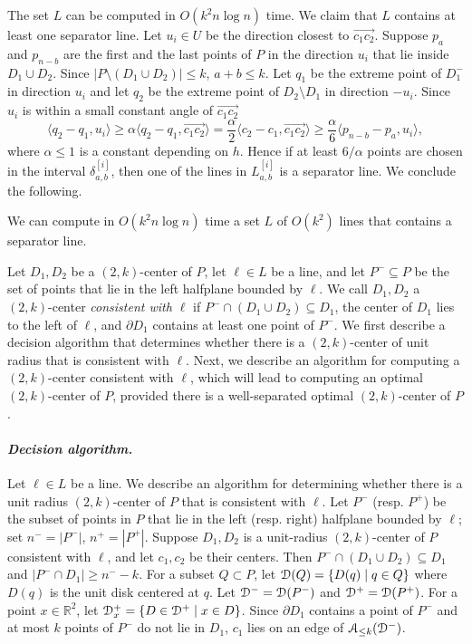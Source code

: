 \documentclass[11pt]{myclass}
\renewcommand{\b}[1]{\ensuremath{\mathbb{#1}}}
\newcommand{\EuD}{\ensuremath{\EuScript{D}}}
\newcommand{\EuA}{\ensuremath{\EuScript{A}}}
\begin{document}
The set $L$ can be computed in $O(k^2 n \log n)$ time.
We claim that $L$ contains at least one separator line.  
Let $u_i \in U$ be the direction closest to $\overrightarrow{c_1 c_2}$.  Suppose $p_a$ and $p_{n-b}$ are the first and the last points of $P$ in the direction $u_i$ that lie inside $D_1 \cup D_2$.  Since $|P \setminus (D_1 \cup D_2)| \leq k$, $a+b \leq k$.  
Let $q_1$ be the extreme point of $D_1^-$ in direction $u_i$ and let $q_2$ be the extreme point of $D_2 \setminus D_1$ in direction $-u_i$.
Since $u_i$ is within a small constant angle of $\overrightarrow{c_1 c_2}$ $$
\langle q_2 - q_1, u_i \rangle 
\geq 
\alpha \langle q_2 - q_1, \overrightarrow{c_1 c_2} \rangle 
= 
\frac{\alpha}{2} \langle c_2 - c_1, \overrightarrow{c_1 c_2} \rangle 
\geq 
\frac{\alpha}{6} \langle p_{n-b} - p_a, u_i \rangle,
$$ 
where $\alpha \leq 1$ is a constant depending on $h$.  Hence if at least $6/\alpha$ points are chosen in the interval $\delta_{a,b}^{[i]}$, then one of the lines in $L_{a,b}^{[i]}$ is a separator line.  We conclude the following.

\begin{lemma}
We can compute in $O(k^2 n \log n)$ time a set $L$ of $O(k^2)$ lines that contains a separator line.
\label{lem:separator-k2}
\end{lemma}

Let $D_1, D_2$ be a $(2,k)$-center of $P$, let $\ell \in L$ be a line, and let $P^- \subseteq P$ be the set of points that lie in the left halfplane bounded by $\ell$.  We call $D_1, D_2$ a $(2,k)$-center \emph{consistent with $\ell$} if $P^- \cap (D_1 \cup D_2) \subseteq D_1$, the center of $D_1$ lies to the left of $\ell$, and $\partial D_1$ contains at least one point of $P^-$.  
We first describe a decision algorithm that determines whether there is a $(2,k)$-center of unit radius that is consistent with $\ell$.  Next, we describe an algorithm for computing a $(2,k)$-center consistent with $\ell$, which will lead to computing an optimal $(2,k)$-center of $P$, provided there is a well-separated optimal $(2,k)$-center of $P$.  

\paragraph{\textbf{\emph{Decision algorithm.}}}
Let $\ell \in L$ be a line.  We describe an algorithm for determining whether there is a unit radius $(2,k)$-center of $P$ that is consistent with $\ell$.  Let $P^-$ (resp. $P^+$) be the subset of points in $P$ that lie in the left (resp. right) halfplane bounded by $\ell$; set $n^- = |P^-|$, $n^+ = |P^+|$.  Suppose $D_1, D_2$ is a unit-radius $(2,k)$-center of $P$ consistent with $\ell$, and let $c_1, c_2$ be their centers.  Then $P^- \cap (D_1 \cup D_2) \subseteq D_1$ and $|P^- \cap D_1| \geq n^- - k$.
For a subset $Q \subset P$, let $\EuD(Q) = \{D(q) \mid q \in Q\}$ where $D(q)$ is the unit disk centered at $q$.  Let $\EuD^- = \EuD(P^-)$ and $\EuD^+ = \EuD(P^+)$.  For a point $x \in \b{R}^2$, let $\EuD^+_x = \{D \in \EuD^+ \mid x \in D\}$.  Since $\partial D_1$ contains a point of $P^-$ and at most $k$ points of $P^-$ do not lie in $D_1$, $c_1$ lies on an edge of $\EuA_{\leq k}(\EuD^-)$.  
\end{document}
